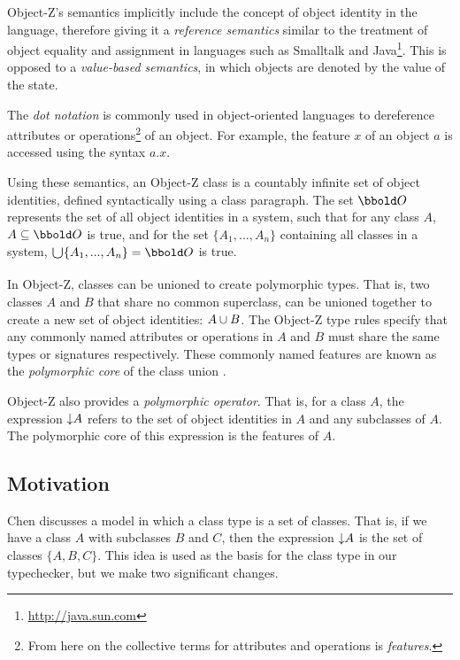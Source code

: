 Object-Z's semantics implicitly include the concept of object identity
in the language, therefore giving it a {\em reference semantics}
similar to the treatment of object equality and assignment in
languages such as Smalltalk \cite{goldberg83} and
Java\footnote{\url{http://java.sun.com}}. This is opposed to a {\em
value-based semantics}, in which objects are denoted by the value of
the state.

The {\em dot notation} is commonly used in object-oriented languages
to dereference attributes or operations\footnote{From here on
the collective terms for attributes and operations is {\em features}.}
of an object. For example, the feature $x$ of an object $a$ is
accessed using the syntax $a.x$.

Using these semantics, an Object-Z class is a countably infinite set
of object identities, defined syntactically using a class
paragraph. The set $\oid$ represents the set of all object identities
in a system, such that for any class $A$, $A \subseteq \oid$ is true,
and for the set $\{ A_{1}, ..., A_{n} \}$ containing all classes in a
system, $\duni \{ A_{1}, ..., A_{n} \} = \oid$ is true.

In Object-Z, classes can be unioned to create polymorphic types. That
is, two classes $A$ and $B$ that share no common superclass, can be
unioned together to create a new set of object identities: $A
\classuni B$. The Object-Z type rules specify that any commonly named
attributes or operations in $A$ and $B$ must share the same types or
signatures respectively. These commonly named features are known as
the {\em polymorphic core} of the class union \cite{dong93}.

Object-Z also provides a {\em polymorphic operator}. That is, for a
class $A$, the expression $\mathord\downarrow A$ refers to the set of object
identities in $A$ and any subclasses of $A$. The polymorphic core of
this expression is the features of $A$.

\subsection{Motivation}

Chen \cite{chen94} discusses a model in which a class type is a set of
classes. That is, if we have a class $A$ with subclasses $B$ and $C$,
then the expression $\mathord\downarrow A$ is the set of classes $\{A, B,
C\}$. This idea is used as the basis for the class type in our
typechecker, but we make two significant changes.

